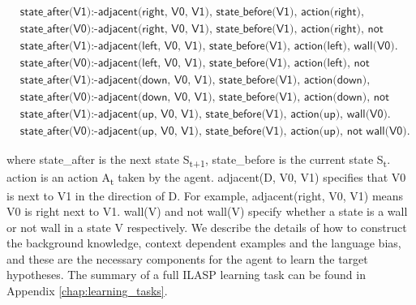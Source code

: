 \begin{equation}
\begin{split}
&\textsf{state\_after(V1):-adjacent(right, V0, V1), state\_before(V1), action(right), wall(V0).}\\
&\textsf{state\_after(V0):-adjacent(right, V0, V1), state\_before(V1), action(right), not wall(V0).}\\
&\textsf{state\_after(V1):-adjacent(left, V0, V1), state\_before(V1), action(left), wall(V0).}\\
&\textsf{state\_after(V0):-adjacent(left, V0, V1), state\_before(V1), action(left), not wall(V0).}\\
&\textsf{state\_after(V1):-adjacent(down, V0, V1), state\_before(V1), action(down), wall(V0).}\\
&\textsf{state\_after(V0):-adjacent(down, V0, V1), state\_before(V1), action(down), not wall(V0).}\\
&\textsf{state\_after(V1):-adjacent(up, V0, V1), state\_before(V1),  action(up), wall(V0).}\\
&\textsf{state\_after(V0):-adjacent(up, V0, V1), state\_before(V1), action(up), not wall(V0).}
\end{split}
\label{target_hypothesis}
\end{equation}

where \textsf{state\_after} is the next state S\textsubscript{t+1}, \textsf{state\_before} is the current state S\textsubscript{t}. \textsf{action} is an action A\textsubscript{t} taken by the agent.
\textsf{adjacent(D, V0, V1)} specifies that V0 is next to V1 in the direction of D. For example, \textsf{adjacent(right, V0, V1)} means V0 is right next to V1. 
\textsf{wall(V)} and \textsf{not wall(V)} specify whether a state is a wall or not wall in a state V respectively.
We describe the details of how to construct the background knowledge, context dependent examples and the language bias, and these are the necessary components for the agent to learn the target hypotheses.
The summary of a full ILASP learning task can be found in Appendix \ref{chap:learning_tasks}.

